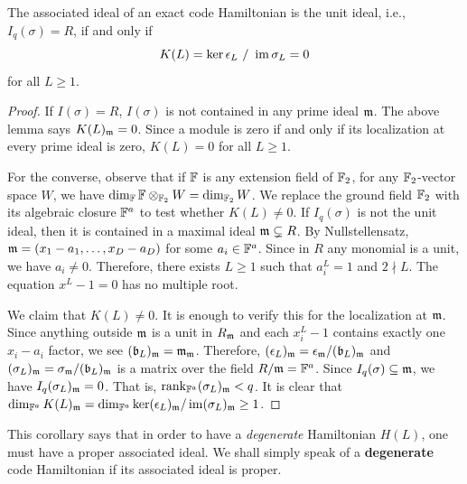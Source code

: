 \begin{cor}
The associated ideal of an exact code Hamiltonian
is the unit ideal, i.e., $I_q(\sigma) = R$,
if and only if
\[
K(L) = \ker \epsilon_L ~/~ \mathop{\mathrm{im}}\nolimits \sigma_L = 0
\]
for all $L \ge 1$.
\label{cor:unit-characteristic-ideal-means-nondegeneracy}
\end{cor}
\begin{proof}
If $I(\sigma) = R$,
$I(\sigma)$ is not contained in any prime ideal $\mathfrak{m}$.
The above lemma says $K(L)_{\mathfrak{m}} = 0$.
Since a module is zero 
if and only if its localization at every prime ideal is zero,
$K(L) = 0$ for all $L \ge 1$.

For the converse, observe that
if $\mathbb{F}$ is any extension field of $\mathbb{F}_2$,
for any $\mathbb{F}_2$-vector space $W$,
we have $\dim_{\mathbb{F}} \mathbb{F} \otimes_{\mathbb{F}_2} W = \dim_{\mathbb{F}_2} W$.
We replace the ground field $\mathbb{F}_2$ with its algebraic closure $\mathbb{F}^a$ to test whether $K(L) \ne 0$.
If $I_q(\sigma)$ is not the unit ideal, then it is contained in a maximal ideal $\mathfrak{m} \subsetneq R$.
By Nullstellensatz, $\mathfrak{m} = (x_1 - a_1,\ldots,x_D - a_D)$ for some $a_i \in \mathbb{F}^a$.
Since in $R$ any monomial is a unit, we have $a_i \ne 0$.
Therefore, there exists $L \ge 1$ such that $a_i^L = 1$ and $2 \nmid L$.
The equation $x^L-1=0$ has no multiple root.

We claim that $K(L) \ne 0$. It is enough to verify this for the localization at $\mathfrak{m}$.
Since anything outside $\mathfrak{m}$ is a unit in $R_{\mathfrak{m}}$
and each $x_i^L-1$ contains exactly one $x_i - a_i$ factor,
we see $(\mathfrak{b}_L)_{\mathfrak{m}} = \mathfrak{m}_{\mathfrak{m}}$.
Therefore, $(\epsilon_L)_{\mathfrak{m}} = \epsilon_{\mathfrak{m}} / (\mathfrak{b}_L)_{\mathfrak{m}}$ and
$(\sigma_L)_{\mathfrak{m}} = \sigma_{\mathfrak{m}} / (\mathfrak{b}_L)_{\mathfrak{m}}$ is a matrix over the field $R/\mathfrak{m} = \mathbb{F}^a$.
Since $I_q(\sigma) \subseteq \mathfrak{m}$, we have $I_q(\sigma_L)_{\mathfrak{m}} = 0$.
That is, $\mathop{\mathrm{rank}}\nolimits_{\mathbb{F}^a} (\sigma_L)_{\mathfrak{m}} < q$.
It is clear that $\dim_{\mathbb{F}^a} K(L)_{\mathfrak{m}} = \dim_{\mathbb{F}^a} \ker (\epsilon_L)_{\mathfrak{m}} / \mathop{\mathrm{im}}\nolimits (\sigma_L)_{\mathfrak{m}} \ge 1$.
\end{proof}
This corollary says that in order to have a {\em degenerate} Hamiltonian $H(L)$,
one must have a proper associated ideal.
We shall simply speak of a {\bf degenerate} code Hamiltonian
if its associated ideal is proper.

